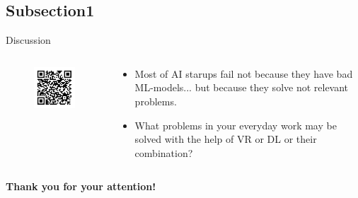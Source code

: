 \documentclass[10pt, xcolor=x11names,compress]{beamer}
\begin{document}
\subsection{Subsection1}
\begin{frame}{Discussion}
	\begin{columns}
		\begin{column}{0.45\textwidth}
			\begin{figure}
				\centering
				\includegraphics[width=.7\textwidth]{images/qrcode.png}
			\end{figure}
		\end{column}
		\begin{column}{0.55\textwidth}
			\begin{itemize}
				\item Most of AI starups fail not because they have bad ML-models... but because they solve not relevant problems.
				\item What problems in your everyday work may be solved with the help of VR or DL or their combination?
			\end{itemize}
		\end{column}
	\end{columns}
\centering
\textbf{Thank you for your attention!}
\end{frame}
\end{document}

